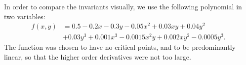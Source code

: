\documentclass[11pt]{article}
\begin{document}
In order to compare the invariants visually, we use the following
polynomial in two variables:
\begin{equation}
  \begin{split}
    f(x, y) &= 0.5 - 0.2x - 0.3y - 0.05x^2 + 0.03xy + 0.04y^2 \\ 
    &+ 0.03y^3 + 0.001x^3 - 0.0015x^2y + 0.002xy^2 - 0.0005y^3.
  \end{split}
\end{equation}
The function was chosen to have no critical points, and to be predominantly
linear, so that the higher order derivatives were not too large.

\begin{figure}

\end{figure}
\end{document}
